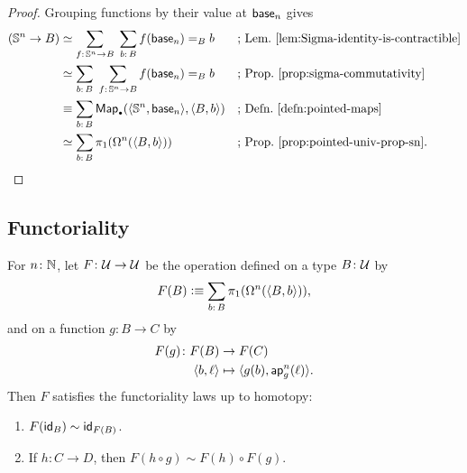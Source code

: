 \begin{proof}
    Grouping functions by their value at $\mathsf{base}_n$ gives
    \begin{align*}
        (\sphere^n\to B)
            &\simeq
                \sum_{f\colon\sphere^n\to B}\;
                \sum_{b\colon B}
                    f(\fun{base}_n)\eq{B}b
            &&\text{; Lem.~\ref{lem:Sigma-identity-is-contractible}}\\
            &\simeq
                \sum_{b\colon B}\;
                \sum_{f\colon\sphere^n\to B}
                    f(\fun{base}_n)\eq{B}b
                &&\text{; Prop.~\ref{prop:sigma-commutativity}}\\
            &\equiv
                \sum_{b\colon B}
                    \fun{Map}_\sbull
                        (
                            \dep{\sphere^n,\fun{base}_n},
                            \dep{B,b}
                        )
                &&\text{; Defn.~\ref{defn:pointed-maps}}\\
            &\simeq
                \sum_{b\colon B}
                    \pi_1(\Omega^n(\dep{B,b}))
                    &&\text{; Prop.~\ref{prop:pointed-univ-prop-sn}.}
    \end{align*}
\end{proof}

\subsection{Functoriality}

\begin{prop}\label{prop:functoriality-F}
    For\/ $n\colon\N$, let\/ $F\colon\univ\to\univ$ be the operation defined on a type\/ $B\colon\univ$ by
    \[
        F(B) \defeq \sum_{b\colon B}\pi_1(\Omega^n(\dep{B,b})),
    \]
    and on a function\/ $g\colon B\to C$ by
    \begin{align*}
        F(g)\colon F(B)&\to F(C)\\
        \dep{b,\ell}&\mapsto\dep{g(b),\fun{ap}^n_g(\ell)}.
    \end{align*}
    Then\/ $F$ satisfies the functoriality laws up to homotopy:
    \begin{enumerate}[-]
        \item $F(\mathsf{id}_B) \sim \mathsf{id}_{F(B)}$.
        \item If\/ $h\colon C\to D$, then\/ $F(h\circ g) \sim F(h)\circ F(g)$.
    \end{enumerate}
\end{prop}

